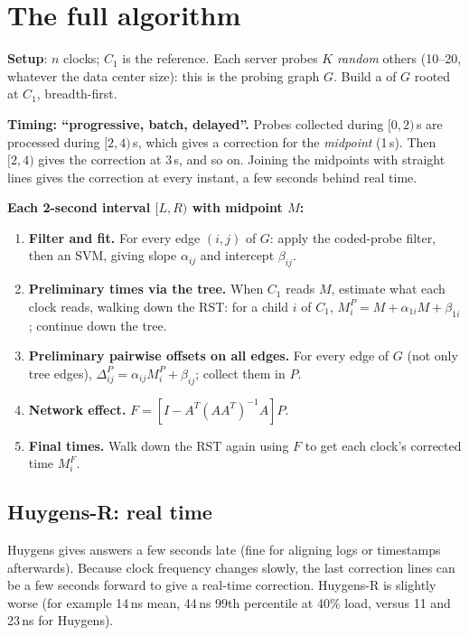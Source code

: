 \section{The full algorithm}

\textbf{Setup}: $n$ clocks; $C_1$ is the reference. Each server probes $K$ \emph{random} others (10--20, whatever the data center size): this is the
probing graph $G$. Build a  of $G$ rooted at $C_1$, breadth-first.

\textbf{Timing: ``progressive, batch, delayed''.} Probes collected during $[0, 2)$\,s are processed during $[2, 4)$\,s, which gives a correction for the
\emph{midpoint} (1\,s). Then $[2, 4)$ gives the correction at 3\,s, and so on. Joining the midpoints with straight lines gives the correction at every
instant, a few seconds behind real time.

\textbf{Each 2-second interval $[L, R)$ with midpoint $M$:}
\begin{enumerate}
  \item \textbf{Filter and fit.} For every edge $(i, j)$ of $G$: apply the coded-probe filter, then an SVM, giving slope $\alpha_{ij}$ and intercept $\beta_{ij}$.
  \item \textbf{Preliminary times via the tree.} When $C_1$ reads $M$, estimate what each clock reads, walking down the RST: for a child $i$ of $C_1$,
        $M_i^P = M + \alpha_{1i}M + \beta_{1i}$; continue down the tree.
  \item \textbf{Preliminary pairwise offsets on all edges.} For every edge of $G$ (not only tree edges), $\Delta^P_{ij} = \alpha_{ij}M_i^P + \beta_{ij}$; collect them in $P$.
  \item \textbf{Network effect.} $F = [I - A^T(AA^T)^{-1}A]P$.
  \item \textbf{Final times.} Walk down the RST again using $F$ to get each clock's corrected time $M_i^F$.
\end{enumerate}

\subsection{Huygens-R: real time}
Huygens gives answers a few seconds late (fine for aligning logs or timestamps afterwards). Because clock frequency changes slowly, the last
correction lines can be  a few seconds forward to give a real-time correction. Huygens-R is slightly worse (for example 14\,ns mean,
44\,ns 99th percentile at 40\% load, versus 11 and 23\,ns for Huygens).

